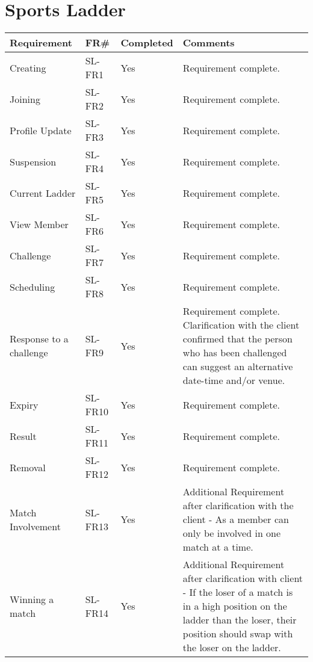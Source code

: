 \section{Sports Ladder}
\begin{tabular}{ |p{5cm}|l|l|p{8cm}|}
\hline
\textbf{Requirement}	&	\textbf{FR\#}	&	\textbf{Completed}	&	\textbf{Comments} \\
\hline
Creating 											& SL-FR1	& Yes 		& Requirement complete. \\
\hline
Joining 											& SL-FR2	& Yes 		& Requirement complete. \\
\hline
Profile Update 										& SL-FR3	& Yes		& Requirement complete. \\
\hline
Suspension 											& SL-FR4	& Yes 		& Requirement complete. \\
\hline
Current Ladder	 									& SL-FR5	& Yes 		& Requirement complete. \\
\hline
View Member											& SL-FR6	& Yes 		& Requirement complete. \\
\hline
Challenge 											& SL-FR7	& Yes		& Requirement complete. \\
\hline
Scheduling 											& SL-FR8	& Yes 		& Requirement complete. \\
\hline
Response to a challenge 							& SL-FR9 	& Yes 		& Requirement complete. Clarification with the client confirmed that the person who has been challenged can suggest an alternative date-time and/or venue. \\
\hline
Expiry 												& SL-FR10 	& Yes		& Requirement complete. \\
\hline
Result 												& SL-FR11 	& Yes 		& Requirement complete. \\
\hline
Removal 											& SL-FR12 	& Yes 		& Requirement complete. \\
\hline
Match Involvement									& SL-FR13 	& Yes 		& Additional Requirement after clarification with the client - As a member can only be involved in one match at a time. \\
\hline
Winning a match 									& SL-FR14 	& Yes 		& Additional Requirement after clarification with client - If the loser of a match is in a high position on the ladder than the loser, their position should swap with the loser on the ladder. \\

\hline
\end{tabular}

